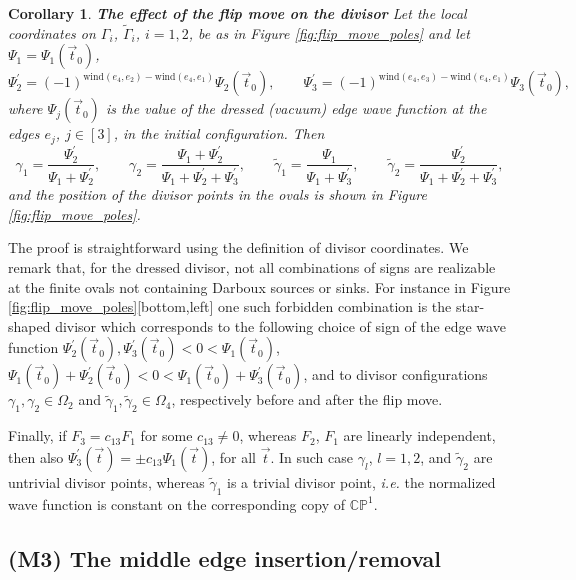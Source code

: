 \documentclass[11pt]{amsart}
\theoremstyle{plain}
\numberwithin{equation}{section}
\newtheorem{corollary}[theorem]{Corollary}
\begin{document}
\begin{corollary}\textbf{The effect of the flip move on the divisor}
Let the local coordinates on $\Gamma_i$, ${\tilde \Gamma_i}$, $i=1,2$, be as in Figure \ref{fig:flip_move_poles} and let $\Psi_1 = \Psi_1 (\vec t_0)$,
\[
\Psi^{\prime}_2 = (-1)^{\mbox{wind}(e_4,e_2)-\mbox{wind}(e_4,e_1)}\Psi_2(\vec t_0), \quad\quad
\Psi^{\prime}_3 = (-1)^{\mbox{wind}(e_4,e_3)-\mbox{wind}(e_4,e_1)}\Psi_3(\vec t_0),
\] 
where $\Psi_{j} (\vec t_0)$ is the value of the dressed (vacuum) edge wave function at the edges $e_j$, $j\in [3]$, in the initial configuration. Then
\[
\gamma_1 = \frac{\Psi^{\prime}_2}{\Psi_1+\Psi^{\prime}_2},\quad\quad \gamma_2 = \frac{\Psi_1+\Psi^{\prime}_2}{\Psi_1+\Psi^{\prime}_2+\Psi^{\prime}_3},\quad\quad{\tilde \gamma}_1 = \frac{\Psi_1}{\Psi_1+\Psi^{\prime}_3},\quad\quad {\tilde\gamma}_2 = \frac{\Psi^{\prime}_2}{\Psi_1+\Psi^{\prime}_2+\Psi^{\prime}_3},
\]
and the position of the divisor points in the ovals is shown in Figure \ref{fig:flip_move_poles}. 
\end{corollary}

The proof is straightforward using the definition of divisor coordinates.
We remark that, for the dressed divisor, not all combinations of signs are realizable at the finite ovals not containing Darboux sources or sinks. 
For instance in Figure \ref{fig:flip_move_poles}[bottom,left] one such forbidden combination is the star-shaped divisor which corresponds to the following choice of sign of the edge wave function 
$\Psi^{\prime}_2(\vec t_0), \Psi^{\prime}_3(\vec t_0)<0< \Psi_1 (\vec t_0)$, $\Psi_1(\vec t_0)+ \Psi^{\prime}_2(\vec t_0)<0<\Psi_1(\vec t_0)+ \Psi^{\prime}_3(\vec t_0)$,
and to divisor configurations $\gamma_1,\gamma_2 \in \Omega_2$ and ${\tilde \gamma}_1, {\tilde\gamma}_2 \in \Omega_4$, respectively before and after the flip move.

Finally, if $F_3 = c_{13}F_1$ for some $c_{13}\not =0$, whereas $F_2$, $F_1$ are linearly independent, then also $\Psi^{\prime}_3(\vec t)= \pm c_{13} \Psi_1(\vec t)$, for all $\vec t$. In such case $\gamma_l$, $l=1,2$, and ${\tilde \gamma}_2$ are untrivial divisor points, whereas ${\tilde \gamma}_1$ is a trivial divisor point, {\sl i.e.} the normalized wave function is constant on the corresponding copy of $\mathbb{CP}^1$.

\subsection{(M3) The middle edge insertion/removal}\label{sec:middle}
\end{document}

